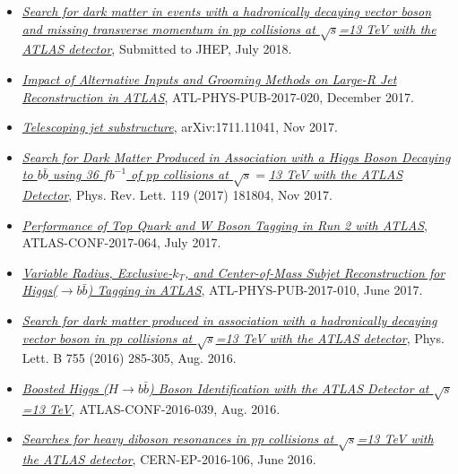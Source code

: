 \documentclass[10pt]{article}
\begin{document}
\begin{itemize}
\item \href{https://arxiv.org/abs/1807.11471}{\textit{Search for dark matter in events with a hadronically decaying vector boson and missing transverse momentum in pp collisions at $\sqrt{s}$=13 TeV with the ATLAS detector}}, Submitted to JHEP, July 2018.

\item \href{https://atlas.web.cern.ch/Atlas/GROUPS/PHYSICS/PUBNOTES/ATL-PHYS-PUB-2017-020/}{\textit{Impact of Alternative Inputs and Grooming Methods on Large-R Jet Reconstruction in ATLAS}}, ATL-PHYS-PUB-2017-020, December 2017.

\item \href{https://arxiv.org/abs/1711.11041}{\textit{Telescoping jet substructure}}, arXiv:1711.11041, Nov 2017.

\item \href{https://arxiv.org/abs/1707.01302}{\textit{Search for Dark Matter Produced in Association with a Higgs Boson Decaying to $b\bar{b}$ using 36 $fb^{-1}$ of pp collisions at $\sqrt{s}=$13 TeV with the ATLAS Detector}}, Phys. Rev. Lett. 119 (2017) 181804, Nov 2017.

\item \href{https://atlas.web.cern.ch/Atlas/GROUPS/PHYSICS/CONFNOTES/ATLAS-CONF-2017-064/}{\textit{Performance of Top Quark and W Boson Tagging in Run 2 with ATLAS}}, ATLAS-CONF-2017-064, July 2017.

\item \href{https://atlas.web.cern.ch/Atlas/GROUPS/PHYSICS/PUBNOTES/ATL-PHYS-PUB-2017-010/}{\textit{Variable Radius, Exclusive-$k_{T}$, and Center-of-Mass Subjet Reconstruction for Higgs($\rightarrow b\bar{b}$) Tagging in ATLAS}}, ATL-PHYS-PUB-2017-010, June 2017.

\item \href{https://arxiv.org/abs/1608.02372}{\textit{Search for dark matter produced in association with a hadronically decaying vector boson in pp collisions at $\sqrt{s}$=13 TeV with the ATLAS detector}}, Phys. Lett. B 755 (2016) 285-305, Aug. 2016.

\item \href{http://atlas.web.cern.ch/Atlas/GROUPS/PHYSICS/CONFNOTES/ATLAS-CONF-2016-039/}{\textit{Boosted Higgs ($H\rightarrow b\bar{b}$) Boson Identification with the ATLAS Detector at $\sqrt{s}$=13 TeV}}, ATLAS-CONF-2016-039, Aug. 2016.

\item \href{https://arxiv.org/abs/1606.04833}{\textit{Searches for heavy diboson resonances in pp collisions at $\sqrt{s}$=13 TeV with the ATLAS detector}}, CERN-EP-2016-106, June 2016.


\end{itemize}
\end{document}
